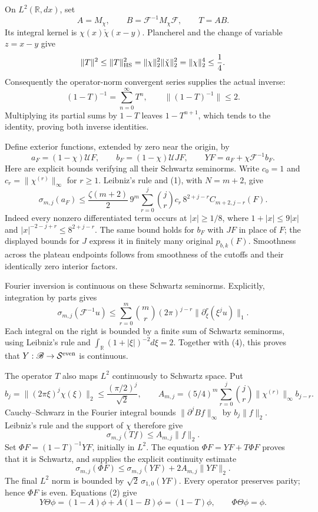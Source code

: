 On \(L^2(\mathbb R,dx)\), set \[
A=M_\chi,\qquad B=\mathcal F^{-1}M_\chi\mathcal F,\qquad T=AB.
\] Its integral kernel is \(\chi(x)\check\chi(x-y)\). Plancherel and the
change of variable \(z=x-y\) give \[
\|T\|^2\le\|T\|_{\rm HS}^2
=\|\chi\|_2^2\|\check\chi\|_2^2
=\|\chi\|_2^4\le\frac14.
\] Consequently the operator-norm convergent series supplies the actual
inverse: \[
\boxed{(1-T)^{-1}=\sum_{n=0}^{\infty}T^n,\qquad
\|(1-T)^{-1}\|\le2.}                                 \tag{3}
\] Multiplying its partial sums by \(1-T\) leaves \(1-T^{n+1}\), which
tends to the identity, proving both inverse identities.

Define exterior functions, extended by zero near the origin, by \[
a_F=(1-\chi)\mathcal UF,\qquad
b_F=(1-\chi)\mathcal UJF,\qquad
YF=a_F+\chi\mathcal F^{-1}b_F.
\] Here are explicit bounds verifying all their Schwartz seminorms.
Write \(c_0=1\) and \(c_r=\|\chi^{(r)}\|_\infty\) for \(r\ge1\).
Leibniz's rule and (1), with \(N=m+2\), give \[
\sigma_{m,j}(a_F)
\le\frac{\zeta(m+2)}2\,9^m
\sum_{r=0}^j\binom jr c_r\,8^{2+j-r}C_{m+2,j-r}(F).  \tag{4}
\] Indeed every nonzero differentiated term occurs at \(|x|\ge1/8\),
where \(1+|x|\le9|x|\) and \(|x|^{-2-j+r}\le8^{2+j-r}\). The same bound
holds for \(b_F\) with \(JF\) in place of \(F\); the displayed bounds
for \(J\) express it in finitely many original \(p_{b,k}(F)\).
Smoothness across the plateau endpoints follows from smoothness of the
cutoffs and their identically zero interior factors.

Fourier inversion is continuous on these Schwartz seminorms. Explicitly,
integration by parts gives \[
\sigma_{m,j}(\mathcal F^{-1}u)
\le\sum_{r=0}^m\binom mr(2\pi)^{j-r}
\bigl\|\partial_\xi^r(\xi^ju)\bigr\|_1.
\] Each integral on the right is bounded by a finite sum of Schwartz
seminorms, using Leibniz's rule and
\(\int_{\mathbb R}(1+|\xi|)^{-2}d\xi=2\). Together with (4), this proves
that \(Y:\mathscr B\to\mathcal S^{\rm even}\) is continuous.

The operator \(T\) also maps \(L^2\) continuously to Schwartz space. Put
\[
b_j=\|(2\pi\xi)^j\chi(\xi)\|_2
\le\frac{(\pi/2)^j}{\sqrt2},\qquad
A_{m,j}=(5/4)^m
\sum_{r=0}^j\binom jr\|\chi^{(r)}\|_\infty b_{j-r}.
\] Cauchy--Schwarz in the Fourier integral bounds
\(\|\partial^jBf\|_\infty\) by \(b_j\|f\|_2\). Leibniz's rule and the
support of \(\chi\) therefore give \[
\sigma_{m,j}(Tf)\le A_{m,j}\|f\|_2.
\] Set \(\Phi F=(1-T)^{-1}YF\), initially in \(L^2\). The equation
\(\Phi F=YF+T\Phi F\) proves that it is Schwartz, and supplies the
explicit continuity estimate \[
\sigma_{m,j}(\Phi F)
\le\sigma_{m,j}(YF)+2A_{m,j}\|YF\|_2.                 \tag{5}
\] The final \(L^2\) norm is bounded by \(\sqrt2\,\sigma_{1,0}(YF)\).
Every operator preserves parity; hence \(\Phi F\) is even. Equations (2)
give \[
Y\Theta\phi=(1-A)\phi+A(1-B)\phi=(1-T)\phi,
\qquad \Phi\Theta\phi=\phi.                          \tag{6}
\]

